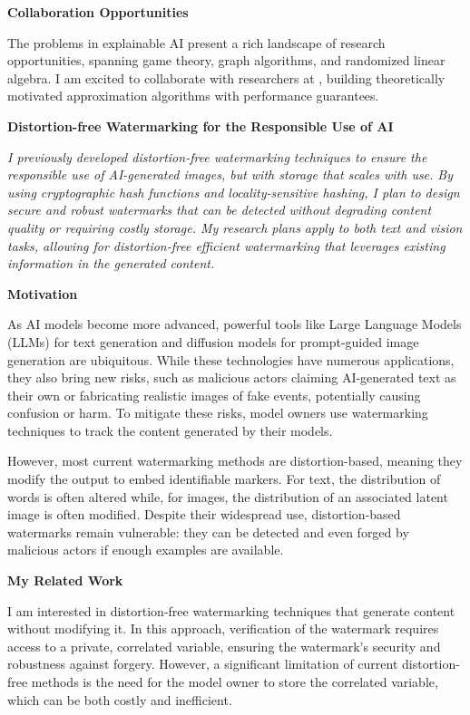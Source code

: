 \documentclass[11pt]{article}
\begin{document}
{{ \large \textbf{Collaboration Opportunities}}

The problems in explainable AI present a rich landscape of research opportunities, spanning game theory, graph algorithms, and randomized linear algebra.
I am excited to collaborate with researchers at \school, building theoretically motivated approximation algorithms with performance guarantees.

\begin{center}
{ \large \textbf{Distortion-free Watermarking for the Responsible Use of AI}}
\end{center}

\textit{I previously developed distortion-free watermarking techniques to ensure the responsible use of AI-generated images, but with storage that scales with use. By using cryptographic hash functions and locality-sensitive hashing, I plan to design secure and robust watermarks that can be detected without degrading content quality or requiring costly storage. My research plans apply to both text and vision tasks, allowing for distortion-free efficient watermarking that leverages existing information in the generated content.}

{ \large \textbf{Motivation}}

As AI models become more advanced, powerful tools like Large Language Models (LLMs) for text generation and diffusion models for prompt-guided image generation are ubiquitous. While these technologies have numerous applications, they also bring new risks, such as malicious actors claiming AI-generated text as their own or fabricating realistic images of fake events, potentially causing confusion or harm. To mitigate these risks, model owners use watermarking techniques to track the content generated by their models.

However, most current watermarking methods are distortion-based, meaning they modify the output to embed identifiable markers. For text, the distribution of words is often altered while, for images, the distribution of an associated latent image is often modified. Despite their widespread use, distortion-based watermarks remain vulnerable: they can be detected and even forged by malicious actors if enough examples are available.

{ \large \textbf{My Related Work}}

I am interested in distortion-free watermarking techniques that generate content without modifying it. In this approach, verification of the watermark requires access to a private, correlated variable, ensuring the watermark's security and robustness against forgery. However, a significant limitation of current distortion-free methods is the need for the model owner to store the correlated variable, which can be both costly and inefficient.

}
\end{document}
